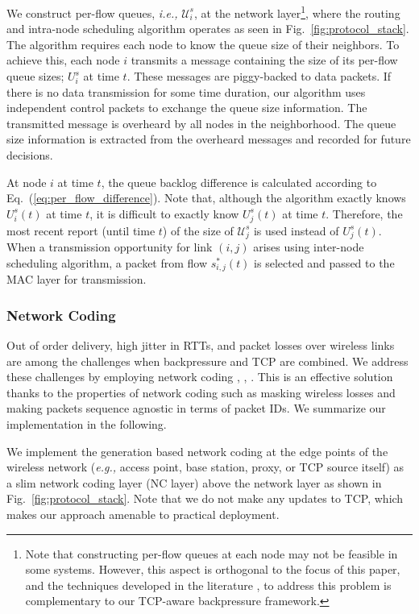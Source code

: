 \documentclass[conference]{IEEEtran}
\newcommand{\ie}{{\em i.e., }}
\newcommand{\eg}{{\em e.g., }}
\newcommand{\Uset}{\mathcal{U}}
\begin{document}
We construct per-flow queues, \ie $\Uset_{i}^{s}$, at the network layer\footnote{\scriptsize Note that constructing per-flow queues at each node may not be feasible in some systems. However, this aspect is orthogonal to the focus of this paper, and the techniques developed in the literature \cite{diffmax}, \cite{locbui} to address this problem is complementary to our TCP-aware backpressure framework.}, where the routing and intra-node scheduling algorithm operates as seen in Fig.~\ref{fig:protocol_stack}. The algorithm requires each node to know the queue size of their neighbors. To achieve this, each node $i$ transmits a message containing the size of its per-flow queue sizes; $U_{i}^{s}$ at time $t$. These messages are piggy-backed to data packets. If there is no data transmission for some time duration, our algorithm uses independent control packets to exchange the queue size information. The transmitted message is overheard by all nodes in the neighborhood. The queue size information is extracted from the overheard messages and recorded for future decisions.

At node $i$ at time $t$, the queue backlog difference is calculated according to Eq.~(\ref{eq:per_flow_difference}). Note that, although the algorithm exactly knows $U_{i}^{s}(t)$ at time $t$, it is difficult to exactly know $U_{j}^{s}(t)$ at time $t$. Therefore, the most recent report (until time $t$) of the size of $\Uset_{j}^{s}$ is used instead of $U_{j}^{s}(t)$.
When a transmission opportunity for link $(i,j)$ arises using inter-node scheduling algorithm, a packet from flow $s_{i,j}^{*}(t)$ is selected and passed to the MAC layer for transmission.




\subsubsection{Network Coding}
Out of order delivery, high jitter in RTTs, and packet losses over wireless links are among the challenges when backpressure and TCP are combined. We address these challenges by employing network coding \cite{NC_meets_TCP}, \cite{multipath_tcp_toledo}, \cite{i2nc}. This is an effective solution thanks to the properties of network coding such as masking wireless losses and making packets sequence agnostic in terms of packet IDs. We summarize our implementation in the following.

We implement the generation based network coding \cite{practical_NC} at the edge points of the wireless network (\eg access point, base station, proxy, or TCP source itself) as a slim network coding layer (NC layer) above the network layer as shown in Fig.~\ref{fig:protocol_stack}. Note that we do not make any updates to TCP, which makes our approach amenable to practical deployment.
\end{document}
